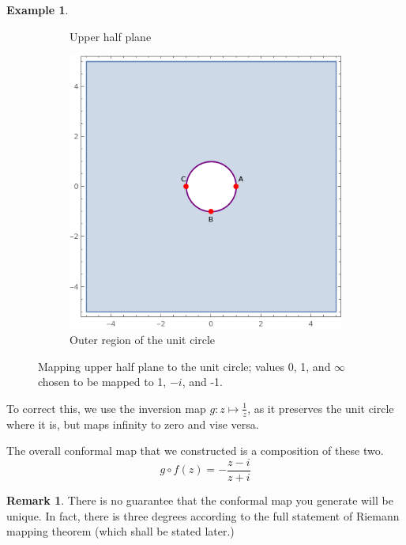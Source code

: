 \documentclass[a4paper, 12pt]{article}
\theoremstyle{definition}
\newtheorem{example}{Example}
\newtheorem{remark}{Remark}
\numberwithin{theorem}{section}
\numberwithin{definition}{section}
\numberwithin{exercise}{section}
\numberwithin{remark}{section}
\numberwithin{figure}{section}
\numberwithin{example}{section}
\begin{document}
\begin{example}
\begin{figure}[tbp]
\begin{subfigure}[b]{0.5\textwidth}
            \caption{Upper half plane}
        \end{subfigure}
        \hfill
        \begin{subfigure}[b]{0.5\textwidth}
            \centering
            \includegraphics[width=\textwidth]{UnitCircle2}
            \caption{Outer region of the unit circle}
        \end{subfigure}
        \caption{Mapping upper half plane to the unit circle; values 0, 1, and $\infty$ chosen to be mapped to 1, $-i$, and -1.}
        \label{fig: UHP to Unit Circle 2}
    \end{figure}
    To correct this, we use the inversion map $g:z \mapsto \frac{1}{z}$, as it preserves the unit circle where it is,
    but maps infinity to zero and vise versa.
    
    The overall conformal map that we constructed is a composition of these two.
    \begin{equation*}
        g \circ f (z) = - \frac{z-i}{z+i}
    \end{equation*}
\end{example}
\begin{remark}
    There is no guarantee that the conformal map you generate will be unique.
    In fact, there is three degrees according to the full statement of Riemann mapping theorem (which shall be stated later.)
\end{remark}
\end{document}

